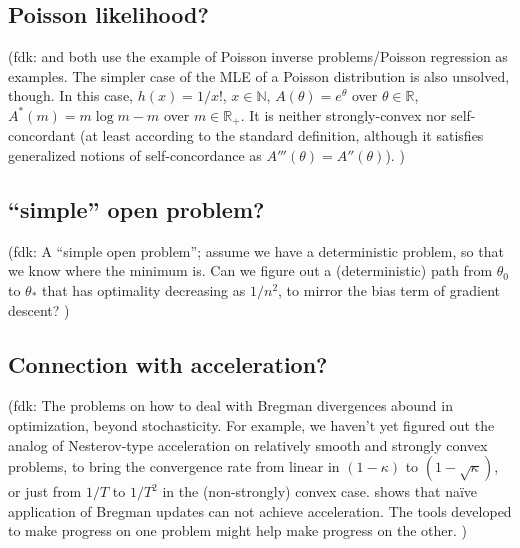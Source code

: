 \documentclass[twoside]{article}
\newcommand{\fdk}[1]{\textcolor{Periwinkle}{(fdk:#1)}}
\newcommand{\m}{m}
\begin{document}
\subsection{Poisson likelihood?}
\fdk{
\citet{bauschke2017descent} and \citet{hanzely2018fastest} both use the example of Poisson inverse problems/Poisson regression
as examples.
The simpler case of the MLE of a Poisson distribution is also unsolved, though.
In this case, $h(x) = 1/x!$, $x \in \mathbb{N}$, $A(\theta) = e^\theta$ over $\theta \in \mathbb{R}$,
$A^*(\m) = \m \log \m - \m$ over $\m \in \mathbb{R}_+$.
It is neither strongly-convex nor self-concordant (at least according to the standard definition,
although it satisfies generalized notions of self-concordance as $A'''(\theta) = A''(\theta)$).
}

\subsection{``simple'' open problem?}
\fdk{
A ``simple open problem'';
assume we have a deterministic problem, so that we know where the minimum is.
Can we figure out a (deterministic) path from $\theta_0$ to $\theta_*$
that has optimality decreasing as $1/n^2$,
to mirror the bias term of gradient descent?
}

\subsection{Connection with acceleration?}
\fdk{
The problems on how to deal with Bregman divergences abound in optimization, beyond stochasticity.
For example, we haven't yet figured out the analog of Nesterov-type acceleration
on relatively smooth and strongly convex problems,
to bring the convergence rate from linear in $(1-\kappa)$ to $(1-\sqrt{\kappa})$,
or just from $1/T$ to $1/T^2$ in the (non-strongly) convex case.
\citet{dragomir2021optimal}  shows that naïve application of Bregman updates can not achieve acceleration.
The tools developed to make progress on one problem might help make progress on the other.
}










\newpage
\end{document}
